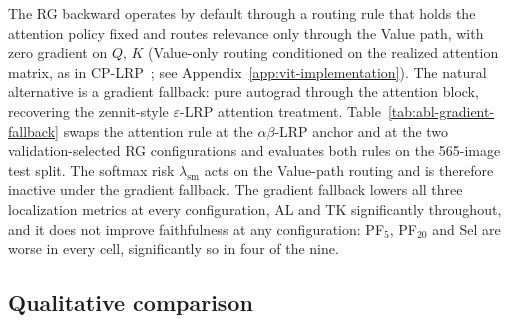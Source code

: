 \documentclass[twoside]{article}
\newif\ifch \chfalse
\newcommand{\ch}[1]{\ifch\textcolor{magenta}{#1}\else#1\fi}
\newcommand{\1}{\mathbf{1}}
\begin{document}
The \ac{RG} backward operates by default through a routing rule that holds the attention policy
fixed and routes relevance only through the Value path, with zero gradient on $Q$, $K$ (Value-only
routing \ch{conditioned on the realized attention matrix, as in CP-LRP~\citep{Ali2022}}; see
Appendix~\ref{app:vit-implementation}).  The natural alternative is a gradient
fallback: pure autograd through the attention block, recovering the zennit-style
$\varepsilon$-\ac{LRP} attention treatment.  Table~\ref{tab:abl-gradient-fallback} swaps the
attention rule at the $\alpha\beta$-\ac{LRP} anchor and at the two validation-selected \ac{RG}
configurations and evaluates both rules on the 565-image test split.  The softmax risk
$\lambda_\text{sm}$ acts on the Value-path routing and is therefore inactive under the gradient
fallback.  The gradient fallback lowers all three localization metrics at every configuration, AL
and TK significantly throughout, and it does not improve faithfulness at any configuration: PF$_5$,
PF$_{20}$ and Sel are worse in every cell, significantly so in four of the nine.

\begin{table}[H]
    \centering
    \caption{\ac{ViT}-B/16, \ac{RG}: attention rule ablation on the ImageNet-S test split (565 images),
    at the anchor and at the loc- and faith-selected configurations.  Each cell shows the gradient
    fallback on top and the composite Value rule of Theorem~\ref{thm:attn-ab-recovery} (gray) below;
    configuration symbols: Appendix~\ref{app:config-symbols}; $^{\dagger}$: paired difference
    significant (paired bootstrap / McNemar for PG, Holm-corrected over the table, $p<0.05$).}
    \label{tab:abl-gradient-fallback}
    \setlength{\tabcolsep}{2pt}
    \renewcommand{\arraystretch}{0.9}
    \small
\end{table}

\subsection{Qualitative comparison}\label{app:qualitative}
\end{document}
